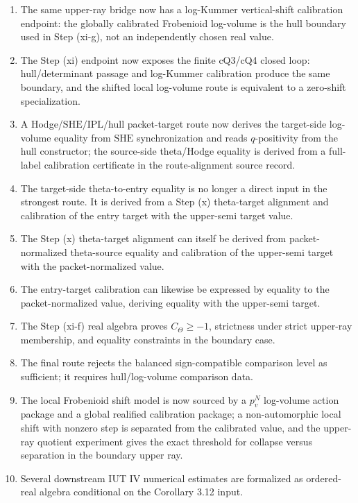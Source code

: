 \documentclass[11pt]{article}
\newcommand{\IUT}{IUT}
\newcommand{\Lean}{Lean}
\newcommand{\SHE}{\ensuremath{\mathrm{SHE}}}
\newcommand{\IPL}{\ensuremath{\mathrm{IPL}}}
\theoremstyle{plain}
\theoremstyle{definition}
\theoremstyle{remark}
\begin{document}
\begin{enumerate}
  proposition over a fixed procession corridor and fixed hull source; from this
  handoff \Lean{} derives q-pilot upper-ray membership and determinant
  normalization at the Step (xi-f) boundary.
\item The same upper-ray bridge now has a log-Kummer vertical-shift calibration
  endpoint: the globally calibrated Frobenioid log-volume is the hull boundary
  used in Step (xi-g), not an independently chosen real value.
\item The Step (xi) endpoint now exposes the finite cQ3/cQ4 closed loop:
  hull/determinant passage and log-Kummer calibration produce the same boundary,
  and the shifted local log-volume route is equivalent to a zero-shift
  specialization.
\item A Hodge/\(\SHE/\IPL\)/hull packet-target route now derives the target-side
  log-volume equality from \(\SHE\) synchronization and reads \(q\)-positivity
  from the hull constructor; the source-side theta/Hodge equality is derived
  from a full-label calibration certificate in the route-alignment source
  record.
\item The target-side theta-to-entry equality is no longer a direct input in the
  strongest route.  It is derived from a Step (x) theta-target alignment and
  calibration of the entry target with the upper-semi target value.
\item The Step (x) theta-target alignment can itself be derived from
  packet-normalized theta-source equality and calibration of the upper-semi
  target with the packet-normalized value.
\item The entry-target calibration can likewise be expressed by equality to the
  packet-normalized value, deriving equality with the upper-semi target.
\item The Step (xi-f) real algebra proves \(C_\Theta\ge-1\), strictness under
  strict upper-ray membership, and equality constraints in the boundary case.
\item The final route rejects the balanced sign-compatible comparison level as
  sufficient; it requires hull/log-volume comparison data.
\item The local Frobenioid shift model is now sourced by a \(p_v^N\)
  log-volume action package and a global realified calibration package; a
  non-automorphic local shift with nonzero step is separated from the calibrated
  value, and the upper-ray quotient experiment gives the exact threshold for
  collapse versus separation in the boundary upper ray.
\item Several downstream \IUT{} IV numerical estimates are formalized as
  ordered-real algebra conditional on the Corollary 3.12 input.
\end{enumerate}
\end{document}
